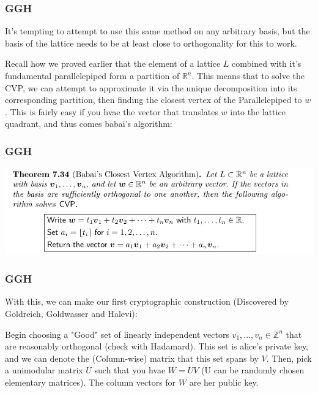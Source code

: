 \documentclass{beamer}
\newcommand{\rat}{\mathbb{R}}
\newcommand{\zee}{\mathbb{Z}}
\begin{document}
\begin{frame}
\frametitle{GGH}
It's tempting to attempt to use this same method on any arbitrary basis, but the basis of the lattice needs to be at least close to orthogonality for this to work.

Recall how we proved earlier that the element of a lattice $L$ combined with it's fundamental parallelepiped form a partition of $\rat^n$. This means that to solve the CVP, we can attempt to approximate it via the unique decomposition into its corresponding partition, then finding the closest vertex of the Parallelepiped to $w$. This is fairly easy if you hvae the vector that translates $w$ into the lattice quadrant, and thus comes babai's algorithm:



\end{frame}

\begin{frame}
\frametitle{GGH}

\begin{center}
\includegraphics[scale=0.4]{babai.png}
\end{center}

\end{frame}

\begin{frame}
\frametitle{GGH}

With this, we can make our first cryptographic construction (Discovered by Goldreich, Goldwasser and Halevi):

Begin choosing a "Good" set of linearly independent vectors $v_1,...,v_n \in \zee^n$ that are reasonably orthogonal (check with Hadamard). This set is alice's private key, and we can denote the (Column-wise) matrix that this set spans by $V$. Then, pick a unimodular matrix $U$ such that you hvae $W = UV$ (U can be randomly chosen elementary matrices). The column vectors for $W$ are her public key.

\end{frame}
\end{document}
